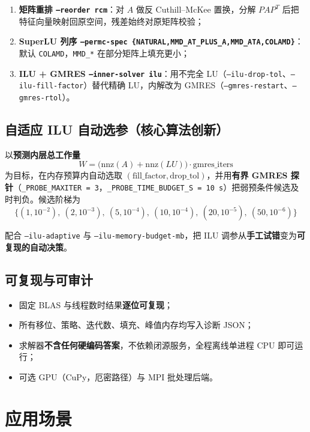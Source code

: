\documentclass[11pt,a4paper]{ctexart}
\newcommand{\code}[1]{\texttt{\small #1}}
\begin{document}
\begin{enumerate}
  \item \textbf{矩阵重排 \code{--reorder rcm}}：对 $A$ 做反 Cuthill--McKee 置换，分解 $PAP^{T}$ 后把特征向量映射回原空间，残差始终对原矩阵校验；
  \item \textbf{SuperLU 列序 \code{--permc-spec \{NATURAL,MMD\_AT\_PLUS\_A,MMD\_ATA,COLAMD\}}}：默认 \code{COLAMD}，\code{MMD\_*} 在部分矩阵上填充更小；
  \item \textbf{ILU + GMRES \code{--inner-solver ilu}}：用不完全 LU（\code{--ilu-drop-tol}、\code{--ilu-fill-factor}）替代精确 LU，内解改为 GMRES（\code{--gmres-restart}、\code{--gmres-rtol}）。
\end{enumerate}

\subsection{自适应 ILU 自动选参（核心算法创新）}

以\textbf{预测内层总工作量}
\[
W = \bigl(\mathrm{nnz}(A) + \mathrm{nnz}(LU)\bigr) \cdot \text{gmres\_iters}
\]
为目标，在内存预算内自动选取 $(\text{fill\_factor}, \text{drop\_tol})$，并用\textbf{有界 GMRES 探针}（\code{\_PROBE\_MAXITER = 3}，\code{\_PROBE\_TIME\_BUDGET\_S = 10\,s}）把弱预条件候选及时判负。候选阶梯为
\[
\{(1,10^{-2}),\ (2,10^{-3}),\ (5,10^{-4}),\ (10,10^{-4}),\ (20,10^{-5}),\ (50,10^{-6})\}
\]

配合 \code{--ilu-adaptive} 与 \code{--ilu-memory-budget-mb}，把 ILU 调参从\textbf{手工试错}变为\textbf{可复现的自动决策}。

\subsection{可复现与可审计}

\begin{itemize}
  \item 固定 BLAS 与线程数时结果\textbf{逐位可复现}；
  \item 所有移位、策略、迭代数、填充、峰值内存均写入诊断 JSON；
  \item 求解器\textbf{不含任何硬编码答案}，不依赖闭源服务，全程离线单进程 CPU 即可运行；
  \item 可选 GPU（CuPy，厄密路径）与 MPI 批处理后端。
\end{itemize}

\section{应用场景}
\end{document}
